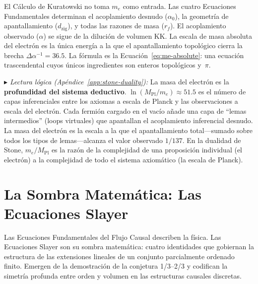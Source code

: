 \documentclass[11pt, a4paper, openany]{book}
\newcommand{\stoneref}[1]{%
  \smallskip\noindent
  {\small\color{structure!70}\textit{$\blacktriangleright$ Lectura
  l\'ogica (Ap\'endice~\ref{app:stone-duality}):} #1}%
  \smallskip}
\begin{document}
\begin{result}[title={La masa del electr\'on se deriva, no se asume}]
\label{res:electron-mass-derived}
El C\'alculo de Kuratowski no toma $m_e$ como entrada. Las cuatro
Ecuaciones Fundamentales determinan el acoplamiento desnudo
($\alpha_0$), la geometr\'ia de apantallamiento ($d_{\mathrm{zig}}$), y
todas las razones de masa ($r_f$). El acoplamiento observado ($\alpha$)
se sigue de la diluci\'on de volumen KK. La escala de masa absoluta del
electr\'on es la \'unica energ\'ia a la que el apantallamiento
topol\'ogico cierra la brecha $\Delta\alpha^{-1} = 36.5$. La f\'ormula
es la Ecuaci\'on~\eqref{eq:me-absolute}: una ecuaci\'on trascendental
cuyos \'unicos ingredientes son enteros topol\'ogicos y~$\pi$.
\end{result}

\stoneref{La masa del electr\'on es la \textbf{profundidad del sistema
deductivo}. $\ln(M_{\mathrm{Pl}}/m_e) \approx 51.5$ es el n\'umero de
capas inferenciales entre los axiomas a escala de Planck y las
observaciones a escala del electr\'on. Cada fermi\'on cargado en el
vac\'io a\~nade una capa de ``lemas intermedios'' (loops virtuales) que
apantallan el acoplamiento inferencial desnudo. La masa del electr\'on
es la escala a la que el apantallamiento total---sumado sobre todos los
tipos de lemas---alcanza el valor observado $1/137$. En la dualidad de
Stone, $m_e/M_{\mathrm{Pl}}$ es la raz\'on de la complejidad de una
proposici\'on individual (el electr\'on) a la complejidad de todo el
sistema axiom\'atico (la escala de Planck).}

\bigskip

\section*{La Sombra Matem\'atica: Las Ecuaciones Slayer}
\label{sec:slayer-equations}

Las Ecuaciones Fundamentales del Flujo Causal describen la f\'isica.
Las Ecuaciones Slayer son su sombra matem\'atica: cuatro identidades que
gobiernan la estructura de las extensiones lineales de un conjunto
parcialmente ordenado finito. Emergen de la demostraci\'on de la
conjetura 1/3--2/3 y codifican la simetr\'ia profunda entre orden y
volumen en las estructuras causales discretas.
\end{document}
